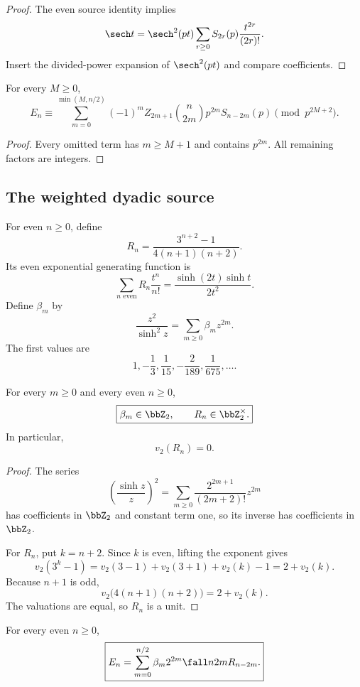 \begin{proof}
The even source identity implies
\[
 \sech t=\sech^2(pt)\sum_{r\geq0}S_{2r}(p)\frac{t^{2r}}{(2r)!}.
\]
Insert the divided-power expansion of $\sech^2(pt)$ and compare coefficients.
\end{proof}

\begin{corollary}
For every $M\geq0$,
\[
 \boxed{E_n\equiv\sum_{m=0}^{\min(M,n/2)}(-1)^mZ_{2m+1}\binom n{2m}p^{2m}S_{n-2m}(p)\pmod{p^{2M+2}}.}
\]
\end{corollary}

\begin{proof}
Every omitted term has $m\geq M+1$ and contains $p^{2m}$. All remaining factors are integers.
\end{proof}

\subsection{The weighted dyadic source}
For even $n\geq0$, define
\[
 \boxed{R_n=\frac{3^{n+2}-1}{4(n+1)(n+2)}.}
\]
Its even exponential generating function is
\[
 \boxed{\sum_{n\text{ even}}R_n\frac{t^n}{n!}=\frac{\sinh(2t)\sinh t}{2t^2}.}
\]
Define $\beta_m$ by
\[
 \boxed{\frac{z^2}{\sinh^2z}=\sum_{m\geq0}\beta_mz^{2m}.}
\]
The first values are
\[
 1,-\frac13,\frac1{15},-\frac2{189},\frac1{675},\ldots.
\]

\begin{lemma}
For every $m\geq0$ and every even $n\geq0$,
\[
 \boxed{\beta_m\in\bbZ_2,\qquad R_n\in\bbZ_2^\times.}
\]
In particular,
\[
 \boxed{v_2(R_n)=0.}
\]
\end{lemma}

\begin{proof}
The series
\[
 \left(\frac{\sinh z}{z}\right)^2
 =\sum_{m\geq0}\frac{2^{2m+1}}{(2m+2)!}z^{2m}
\]
has coefficients in $\bbZ_2$ and constant term one, so its inverse has coefficients in $\bbZ_2$.

For $R_n$, put $k=n+2$. Since $k$ is even, lifting the exponent gives
\[
 v_2(3^k-1)=v_2(3-1)+v_2(3+1)+v_2(k)-1=2+v_2(k).
\]
Because $n+1$ is odd,
\[
 v_2\bigl(4(n+1)(n+2)\bigr)=2+v_2(k).
\]
The valuations are equal, so $R_n$ is a unit.
\end{proof}

\begin{theorem}
For every even $n\geq0$,
\[
 \boxed{E_n=\sum_{m=0}^{n/2}\beta_m2^{2m}\fall n{2m}R_{n-2m}.}
\]
\end{theorem}

